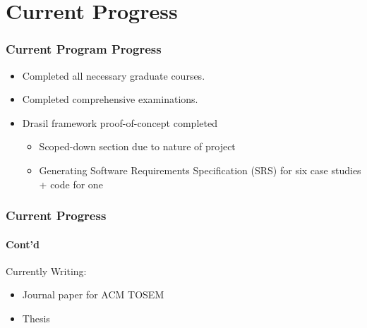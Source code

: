 \documentclass{beamer}
\begin{document}
\section[Progress]{Current Progress}


\begin{frame}

\frametitle{Current Program Progress}

\begin{itemize}
\item Completed all necessary graduate courses.
\item Completed comprehensive examinations.
\item Drasil framework proof-of-concept completed
	\begin{itemize}
		\item Scoped-down section due to nature of project
		\item Generating Software Requirements Specification (SRS) for six case studies + code for one
	\end{itemize}
\end{itemize}
\end{frame}

\begin{frame}

\frametitle{Current Progress}
\framesubtitle{Cont'd}

Currently Writing:
\begin{itemize}
\item Journal paper for ACM TOSEM
\item Thesis
\end{itemize}
\end{frame}
\end{document}
